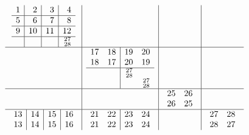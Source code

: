\documentclass[12pt,a4paper]{amsart}
\begin{document}
\begin{align*}
  \begin{array}{c|c|c|c}
\begin{array}{r|r|r|r}%
1&2&3&4\\\hline%
5&6&7&8\\\hline%
9&10&11&12\\\hline%
  &  &  &^{27}_{28}
\end{array}
&&&\\\hline
&
\begin{array}{rr|rr}%
17&18&19&20\\%
18&17&20&19\\\hline%
  &  &^{27}_{28}&  \\%
  &  &  &^{27}_{28}\\%
\end{array}
&&\\\hline
&&
\begin{array}{rr}%
25&26\\%
26&25\\%
\end{array}
&\\\hline
\begin{array}{r|r|r|r}%
13&14&15&16\\%
13&14&15&16\\%
\end{array}
&
\begin{array}{rr|rr}%
21&22&23&24\\%
21&22&23&24\\%
\end{array}
&&
\begin{array}{rr}%
27&28\\%
28&27\\%
\end{array}
\\
\end{array}
\end{align*}
\end{document}
